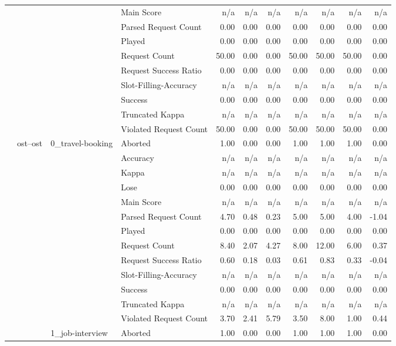 \begin{tabular}{llllrrrrrrr}
 &  &  & Main Score & n/a & n/a & n/a & n/a & n/a & n/a & n/a \\
 &  &  & Parsed Request Count & 0.00 & 0.00 & 0.00 & 0.00 & 0.00 & 0.00 & 0.00 \\
 &  &  & Played & 0.00 & 0.00 & 0.00 & 0.00 & 0.00 & 0.00 & 0.00 \\
 &  &  & Request Count & 50.00 & 0.00 & 0.00 & 50.00 & 50.00 & 50.00 & 0.00 \\
 &  &  & Request Success Ratio & 0.00 & 0.00 & 0.00 & 0.00 & 0.00 & 0.00 & 0.00 \\
 &  &  & Slot-Filling-Accuracy & n/a & n/a & n/a & n/a & n/a & n/a & n/a \\
 &  &  & Success & 0.00 & 0.00 & 0.00 & 0.00 & 0.00 & 0.00 & 0.00 \\
 &  &  & Truncated Kappa & n/a & n/a & n/a & n/a & n/a & n/a & n/a \\
 &  &  & Violated Request Count & 50.00 & 0.00 & 0.00 & 50.00 & 50.00 & 50.00 & 0.00 \\
\cline{2-11} \cline{3-11}
 & \multirow[t]{65}{*}{ost--ost} & \multirow[t]{13}{*}{0_travel-booking} & Aborted & 1.00 & 0.00 & 0.00 & 1.00 & 1.00 & 1.00 & 0.00 \\
 &  &  & Accuracy & n/a & n/a & n/a & n/a & n/a & n/a & n/a \\
 &  &  & Kappa & n/a & n/a & n/a & n/a & n/a & n/a & n/a \\
 &  &  & Lose & 0.00 & 0.00 & 0.00 & 0.00 & 0.00 & 0.00 & 0.00 \\
 &  &  & Main Score & n/a & n/a & n/a & n/a & n/a & n/a & n/a \\
 &  &  & Parsed Request Count & 4.70 & 0.48 & 0.23 & 5.00 & 5.00 & 4.00 & -1.04 \\
 &  &  & Played & 0.00 & 0.00 & 0.00 & 0.00 & 0.00 & 0.00 & 0.00 \\
 &  &  & Request Count & 8.40 & 2.07 & 4.27 & 8.00 & 12.00 & 6.00 & 0.37 \\
 &  &  & Request Success Ratio & 0.60 & 0.18 & 0.03 & 0.61 & 0.83 & 0.33 & -0.04 \\
 &  &  & Slot-Filling-Accuracy & n/a & n/a & n/a & n/a & n/a & n/a & n/a \\
 &  &  & Success & 0.00 & 0.00 & 0.00 & 0.00 & 0.00 & 0.00 & 0.00 \\
 &  &  & Truncated Kappa & n/a & n/a & n/a & n/a & n/a & n/a & n/a \\
 &  &  & Violated Request Count & 3.70 & 2.41 & 5.79 & 3.50 & 8.00 & 1.00 & 0.44 \\
\cline{3-11}
 &  & \multirow[t]{13}{*}{1_job-interview} & Aborted & 1.00 & 0.00 & 0.00 & 1.00 & 1.00 & 1.00 & 0.00 \\

\end{tabular}
